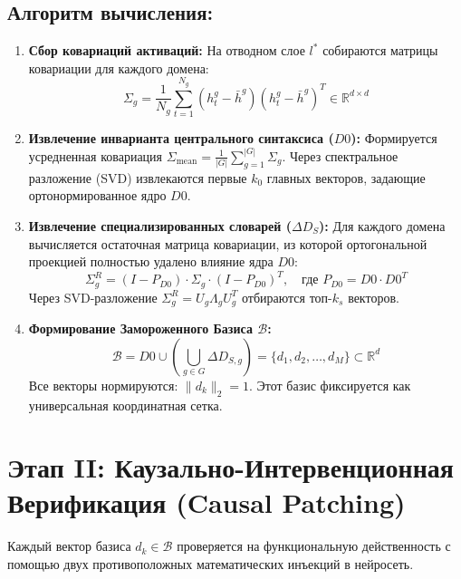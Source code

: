\documentclass[11pt,a4paper]{article}
\begin{document}
\subsection*{Алгоритм вычисления:}

\begin{enumerate}
    \item \textbf{Сбор ковариаций активаций:} На отводном слое $l^*$ собираются матрицы ковариации для каждого домена:
    \begin{equation}
    \Sigma_g = \frac{1}{N_g} \sum_{t=1}^{N_g} (h_t^g - \bar{h}^g)(h_t^g - \bar{h}^g)^T \in \mathbb{R}^{d \times d}
    \end{equation}
    
    \item \textbf{Извлечение инварианта центрального синтаксиса ($D0$):} Формируется усредненная ковариация $\Sigma_{\text{mean}} = \frac{1}{|G|} \sum_{g=1}^{|G|} \Sigma_g$. Через спектральное разложение (SVD) извлекаются первые $k_0$ главных векторов, задающие ортонормированное ядро $D0$.
    
    \item \textbf{Извлечение специализированных словарей ($\Delta D_S$):} Для каждого домена вычисляется остаточная матрица ковариации, из которой ортогональной проекцией полностью удалено влияние ядра $D0$:
    \begin{equation}
    \Sigma_g^R = (I - P_{D0}) \cdot \Sigma_g \cdot (I - P_{D0})^T, \quad \text{где } P_{D0} = D0 \cdot D0^T
    \end{equation}
    Через SVD-разложение $\Sigma_g^R = U_g \Lambda_g U_g^T$ отбираются топ-$k_s$ векторов.
    
    \item \textbf{Формирование Замороженного Базиса $\mathcal{B}$:}
    \begin{equation}
    \mathcal{B} = D0 \cup \left( \bigcup_{g \in G} \Delta D_{S, g} \right) = \{d_1, d_2, \dots, d_M\} \subset \mathbb{R}^d
    \end{equation}
    Все векторы нормируются: $\|d_k\|_2 = 1$. Этот базис фиксируется как универсальная координатная сетка.
\end{enumerate}

\section{Этап II: Каузально-Интервенционная Верификация (Causal Patching)}

Каждый вектор базиса $d_k \in \mathcal{B}$ проверяется на функциональную действенность с помощью двух противоположных математических инъекций в нейросеть.
\end{document}
